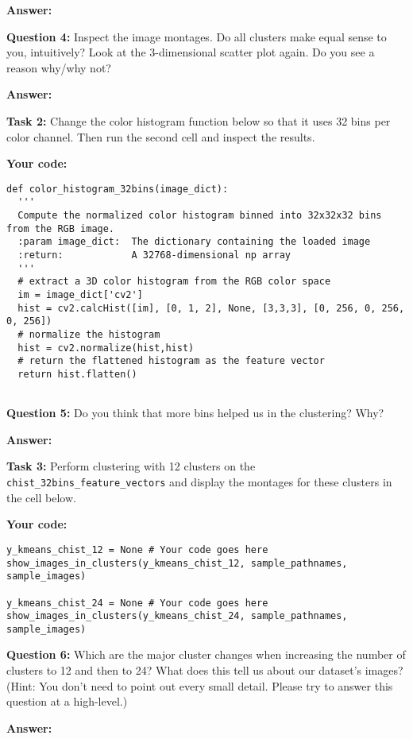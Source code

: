\documentclass[11pt]{article}
\begin{document}
\textbf{Answer:}


\noindent\textbf{Question 4:} Inspect the image montages. Do all clusters make equal sense to you, intuitively? Look at the 3-dimensional scatter plot again. Do you see a reason why/why not?

\textbf{Answer:}


\noindent\textbf{Task 2:} Change the color histogram function below so that it uses 32 bins per color channel. Then run the second cell and inspect the results.

\textbf{Your code:}

\begin{lstlisting}
def color_histogram_32bins(image_dict):
  '''
  Compute the normalized color histogram binned into 32x32x32 bins from the RGB image.
  :param image_dict:  The dictionary containing the loaded image
  :return:            A 32768-dimensional np array
  '''
  # extract a 3D color histogram from the RGB color space
  im = image_dict['cv2']
  hist = cv2.calcHist([im], [0, 1, 2], None, [3,3,3], [0, 256, 0, 256, 0, 256])
  # normalize the histogram
  hist = cv2.normalize(hist,hist)
  # return the flattened histogram as the feature vector
  return hist.flatten()
 
\end{lstlisting} 


\noindent\textbf{Question 5:} Do you think that more bins helped us in the clustering? Why?

\textbf{Answer:}


\noindent\textbf{Task 3:} Perform clustering with 12 clusters on the \texttt{chist\_32bins\_feature\_vectors} and display the montages for these clusters in the cell below.

\textbf{Your code:}
\begin{lstlisting}
y_kmeans_chist_12 = None # Your code goes here
show_images_in_clusters(y_kmeans_chist_12, sample_pathnames, sample_images)

y_kmeans_chist_24 = None # Your code goes here
show_images_in_clusters(y_kmeans_chist_24, sample_pathnames, sample_images)
\end{lstlisting}


\noindent\textbf{Question 6:} Which are the major cluster changes when increasing the number of clusters to 12 and then to 24? What does this tell us about our dataset's images? (Hint: You don't need to point out every small detail. Please try to answer this question at a high-level.)

\textbf{Answer:}
\end{document}
